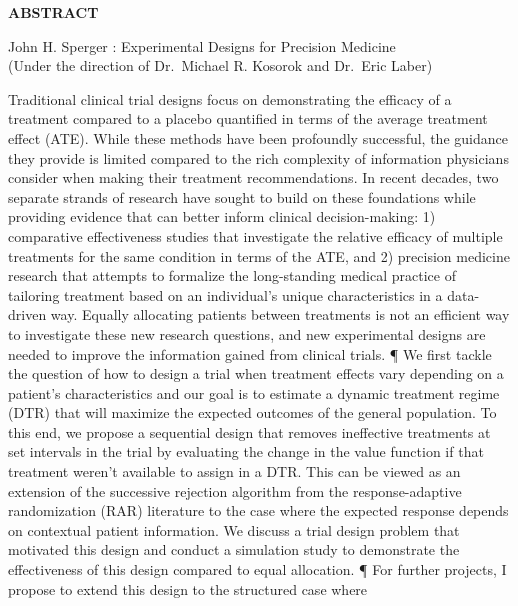 \documentclass[12pt,,letterpaper,twoside]{report}
\begin{document}
\begin{center}
\vspace*{52pt}
{\normalsize \textbf{ABSTRACT}}
\vspace{11pt}

\begin{singlespace}
 John H. Sperger : Experimental Designs for Precision Medicine \\
(Under the direction of   Dr.~Michael R. Kosorok and  Dr.~Eric Laber)
\end{singlespace}
\end{center}

Traditional clinical trial designs focus on demonstrating the efficacy
of a treatment compared to a placebo quantified in terms of the average
treatment effect (ATE). While these methods have been profoundly
successful, the guidance they provide is limited compared to the rich
complexity of information physicians consider when making their
treatment recommendations. In recent decades, two separate strands of
research have sought to build on these foundations while providing
evidence that can better inform clinical decision-making: 1) comparative
effectiveness studies that investigate the relative efficacy of multiple
treatments for the same condition in terms of the ATE, and 2) precision
medicine research that attempts to formalize the long-standing medical
practice of tailoring treatment based on an individual's unique
characteristics in a data-driven way. Equally allocating patients
between treatments is not an efficient way to investigate these new
research questions, and new experimental designs are needed to improve
the information gained from clinical trials. ¶ We first tackle the
question of how to design a trial when treatment effects vary depending
on a patient's characteristics and our goal is to estimate a dynamic
treatment regime (DTR) that will maximize the expected outcomes of the
general population. To this end, we propose a sequential design that
removes ineffective treatments at set intervals in the trial by
evaluating the change in the value function if that treatment weren't
available to assign in a DTR. This can be viewed as an extension of the
successive rejection algorithm from the response-adaptive randomization
(RAR) literature to the case where the expected response depends on
contextual patient information. We discuss a trial design problem that
motivated this design and conduct a simulation study to demonstrate the
effectiveness of this design compared to equal allocation. ¶ For further
projects, I propose to extend this design to the structured case where
\end{document}
